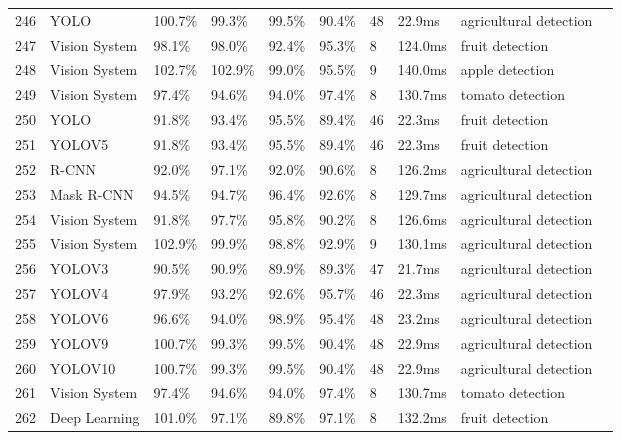\begin{table*}[htbp]
\begin{tabular}{p{}p{}p{}p{}p{}p{}p{}p{}p{}p{}}
 246 & YOLO & 100.7\% & 99.3\% & 99.5\% & 90.4\% & 48 & 22.9ms & agricultural detection & \cite{precis2024berry} \\
 247 & Vision System & 98.1\% & 98.0\% & 92.4\% & 95.3\% & 8 & 124.0ms & fruit detection & \cite{foodres2024fusion} \\
 248 & Vision System & 102.7\% & 102.9\% & 99.0\% & 95.5\% & 9 & 140.0ms & apple detection & \cite{agroscope2024aspen} \\
 249 & Vision System & 97.4\% & 94.6\% & 94.0\% & 97.4\% & 8 & 130.7ms & tomato detection & \cite{chiang2023aspen} \\
 250 & YOLO & 91.8\% & 93.4\% & 95.5\% & 89.4\% & 46 & 22.3ms & fruit detection & \cite{zhang2024dragon} \\
 251 & YOLOV5 & 91.8\% & 93.4\% & 95.5\% & 89.4\% & 46 & 22.3ms & fruit detection & \cite{yu2024object} \\
 252 & R-CNN & 92.0\% & 97.1\% & 92.0\% & 90.6\% & 8 & 126.2ms & agricultural detection & \cite{cai2018cascade} \\
 253 & Mask R-CNN & 94.5\% & 94.7\% & 96.4\% & 92.6\% & 8 & 129.7ms & agricultural detection & \cite{he2017mask} \\
 254 & Vision System & 91.8\% & 97.7\% & 95.8\% & 90.2\% & 8 & 126.6ms & agricultural detection & \cite{chen2019hybrid} \\
 255 & Vision System & 102.9\% & 99.9\% & 98.8\% & 92.9\% & 9 & 130.1ms & agricultural detection & \cite{qiao2021detectors} \\
 256 & YOLOV3 & 90.5\% & 90.9\% & 89.9\% & 89.3\% & 47 & 21.7ms & agricultural detection & \cite{redmon2018yolov3} \\
 257 & YOLOV4 & 97.9\% & 93.2\% & 92.6\% & 95.7\% & 46 & 22.3ms & agricultural detection & \cite{bochkovskiy2020yolov4} \\
 258 & YOLOV6 & 96.6\% & 94.0\% & 98.9\% & 95.4\% & 48 & 23.2ms & agricultural detection & \cite{li2022yolov6} \\
 259 & YOLOV9 & 100.7\% & 99.3\% & 99.5\% & 90.4\% & 48 & 22.9ms & agricultural detection & \cite{yaseen2024yolov9} \\
 260 & YOLOV10 & 100.7\% & 99.3\% & 99.5\% & 90.4\% & 48 & 22.9ms & agricultural detection & \cite{wang2024yolov10} \\
 261 & Vision System & 97.4\% & 94.6\% & 94.0\% & 97.4\% & 8 & 130.7ms & tomato detection & \cite{li2023mta} \\
 262 & Deep Learning & 101.0\% & 97.1\% & 89.8\% & 97.1\% & 8 & 132.2ms & fruit detection & \cite{xiong2021improved} \\

\end{tabular}
\end{table*}
